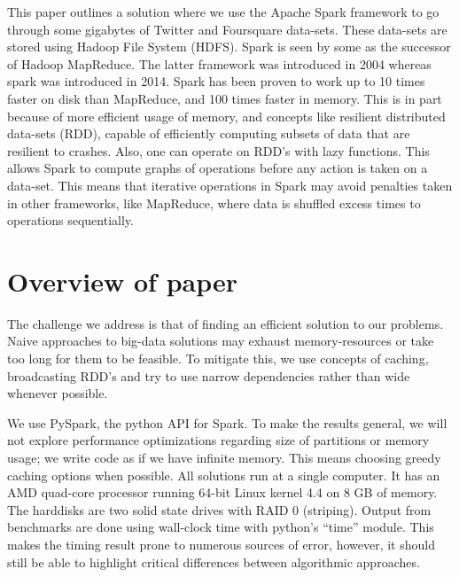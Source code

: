 {This paper outlines a solution where we use the Apache Spark framework to go through some gigabytes of Twitter and Foursquare data-sets. These data-sets are stored using Hadoop File System (HDFS).  Spark is seen by some as the successor of Hadoop MapReduce. The latter framework was introduced in 2004\cite{mapReduce2004} whereas spark was introduced in 2014.  Spark has been proven to work up to 10 times faster on disk than MapReduce, and 100 times faster in memory. This is in part because of more efficient usage of memory, and concepts like resilient distributed data-sets (RDD), capable of efficiently computing subsets of data that are resilient to crashes. Also, one can operate on  RDD's  with lazy functions. This allows Spark to compute graphs of operations before any action is taken on a data-set. This means that iterative operations in Spark may avoid penalties taken in other frameworks, like MapReduce, where data is shuffled excess times to operations sequentially.


\section{Overview of paper}

The challenge we address is that of finding an efficient solution to our problems. Naive approaches 
to big-data solutions may  exhaust memory-resources or take too long for them to be feasible. To mitigate this, we use concepts of caching, broadcasting RDD's and try to use narrow dependencies rather than wide whenever possible.

We use PySpark, the python API for Spark. To make the results general, we will not explore performance optimizations regarding size of partitions or memory usage; we write code as if we have infinite memory. This means choosing greedy caching options when possible.
All solutions run at a single computer. It has an AMD quad-core processor running 64-bit Linux kernel 4.4 on 8 GB of memory. The harddisks are two solid state drives with RAID 0 (striping). Output from benchmarks are done using wall-clock time with python's ``time'' module. This makes the timing result prone to numerous sources of error, however, it should still be able to highlight critical differences between algorithmic approaches.
}


